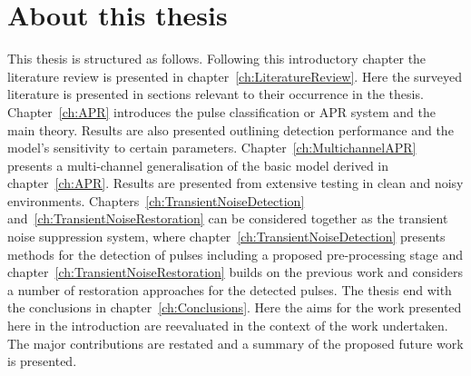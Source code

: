 \section{About this thesis}
This thesis is structured as follows. Following this introductory chapter the literature review is presented in chapter~\ref{ch:LiteratureReview}. Here the surveyed literature is presented in sections relevant to their occurrence in the thesis. Chapter~\ref{ch:APR} introduces the pulse classification or APR system and the main theory. Results are also presented outlining detection performance and the model's sensitivity to certain parameters. Chapter~\ref{ch:MultichannelAPR} presents a multi-channel generalisation of the basic model derived in chapter~\ref{ch:APR}. Results are presented from extensive testing in clean and noisy environments. Chapters~\ref{ch:TransientNoiseDetection} and~\ref{ch:TransientNoiseRestoration} can be considered together as the transient noise suppression system, where chapter~\ref{ch:TransientNoiseDetection} presents methods for the detection of pulses including a proposed pre-processing stage and chapter~\ref{ch:TransientNoiseRestoration} builds on the previous work and considers a number of restoration approaches for the detected pulses. The thesis end with the conclusions in chapter~\ref{ch:Conclusions}. Here the aims for the work presented here in the introduction are reevaluated in the context of the work undertaken. The major contributions are restated and a summary of the proposed future work is presented.



